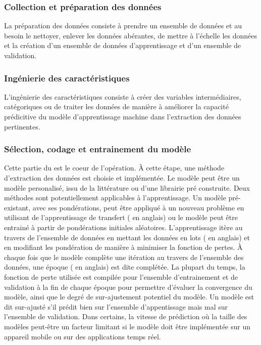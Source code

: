     \subsubsection{Collection et préparation des données}
        La préparation des données consiste à prendre un ensemble de données et au besoin le nettoyer, enlever les données abérantes, de mettre à l'échelle les données et la création d'un ensemble de données d'apprentissage et d'un ensemble de validation.
    \subsubsection{Ingénierie des caractéristiques}
      L'ingénierie des caractéristiques consiste à créer des variables intermédiaires, catégoriques ou de traiter les données de manière à améliorer la capacité prédicitive du modèle d'apprentissage machine dans l'extraction des données pertinentes.
    \subsubsection{Sélection, codage et entrainement du modèle}
      Cette partie du  \fg{} est le coeur de l'opération. À cette étape, une méthode d'extraction des données est choisie et implémentée. Le modèle peut être un modèle personalisé, issu de la littérature ou d'une librairie pré construite. Deux méthodes sont potentiellement applicables à l'apprentissage. Un modèle pré-existant, avec ses pondérations, peut être appliqué à un nouveau problème en utilisant de l'apprentissage de transfert ( \fg{} en anglais) ou le modèle peut être entrainé à partir de pondérations initiales aléatoires. L'apprentissage itère au travers de l'ensemble de données en mettant les données en lots ( \fg{} en anglais) et en modifiant les pondération de manière à minimiser la fonction de pertes. À chaque fois que le modèle complète une itération au travers de l'ensemble des données, une époque ( \fg{} en anglais) est dite complétée. La plupart du temps, la fonction de perte utilisée est compilée pour l'ensemble d'entrainement et de validation à la fin de chaque époque pour permettre d'évaluer la convergence du modèle, ainsi que le degré de sur-ajustement potentiel du modèle. Un modèle est dit sur-ajusté s'il prédit bien sur l'ensemble d'appentissage mais mal sur l'ensemble de validation. Dans certains, la vitesse de prédiction où la taille des modèles peut-être un facteur limitant si le modèle doit être implémentée sur un appareil mobile ou sur des applications temps réel.
